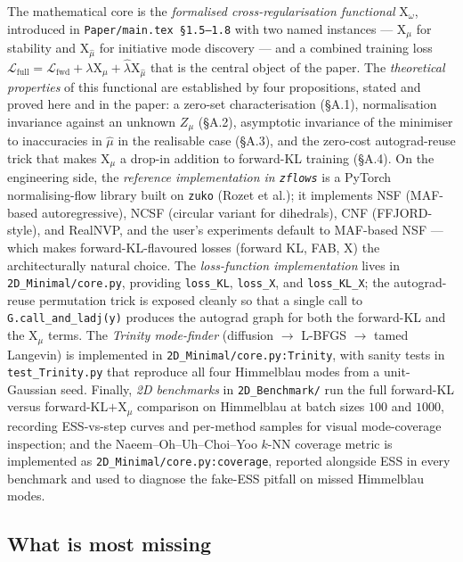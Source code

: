 \documentclass[11pt,letterpaper]{article}
\newcommand{\Xfun}{\mathrm{X}}
\theoremstyle{plain}
\begin{document}
The mathematical core is the \emph{formalised cross-regularisation
functional} $\Xfun_\omega$, introduced in \texttt{Paper/main.tex
\S1.5--1.8} with two named instances --- $\Xfun_\mu$ for stability and
$\Xfun_{\hat\mu}$ for initiative mode discovery --- and a combined training
loss $\mathcal L_{\mathrm{full}}=\mathcal L_{\mathrm{fwd}}+\lambda\Xfun_\mu
+\hat\lambda\Xfun_{\hat\mu}$ that is the central object of the paper. The
\emph{theoretical properties} of this functional are established by four
propositions, stated and proved here and in the paper: a zero-set
characterisation (\S A.1), normalisation invariance against an unknown
$Z_\mu$ (\S A.2), asymptotic invariance of the minimiser to inaccuracies in
$\hat\mu$ in the realisable case (\S A.3), and the zero-cost autograd-reuse
trick that makes $\Xfun_\mu$ a drop-in addition to forward-KL training
(\S A.4). On the engineering side, the \emph{reference implementation in
\texttt{zflows}} is a PyTorch normalising-flow library built on
\texttt{zuko} (Rozet et al.); it implements NSF (MAF-based autoregressive),
NCSF (circular variant for dihedrals), CNF (FFJORD-style), and RealNVP, and
the user's experiments default to MAF-based NSF --- which makes
forward-KL-flavoured losses (forward KL, FAB, $\Xfun$) the architecturally
natural choice. The \emph{loss-function implementation} lives in
\texttt{2D\_Minimal/core.py}, providing \texttt{loss\_KL}, \texttt{loss\_X},
and \texttt{loss\_KL\_X}; the autograd-reuse permutation trick is exposed
cleanly so that a single call to \texttt{G.call\_and\_ladj(y)} produces the
autograd graph for both the forward-KL and the $\Xfun_\mu$ terms. The
\emph{Trinity mode-finder} (diffusion $\to$ L-BFGS $\to$ tamed Langevin) is
implemented in \texttt{2D\_Minimal/core.py:Trinity}, with sanity tests in
\texttt{test\_Trinity.py} that reproduce all four Himmelblau modes from a
unit-Gaussian seed. Finally, \emph{2D benchmarks} in
\texttt{2D\_Benchmark/} run the full forward-KL versus
forward-KL$+\Xfun_\mu$ comparison on Himmelblau at batch sizes $100$ and
$1000$, recording ESS-vs-step curves and per-method samples for visual
mode-coverage inspection; and the Naeem--Oh--Uh--Choi--Yoo $k$-NN coverage
metric is implemented as \texttt{2D\_Minimal/core.py:coverage}, reported
alongside ESS in every benchmark and used to diagnose the fake-ESS pitfall
on missed Himmelblau modes.

\subsection{What is most missing}
\end{document}
